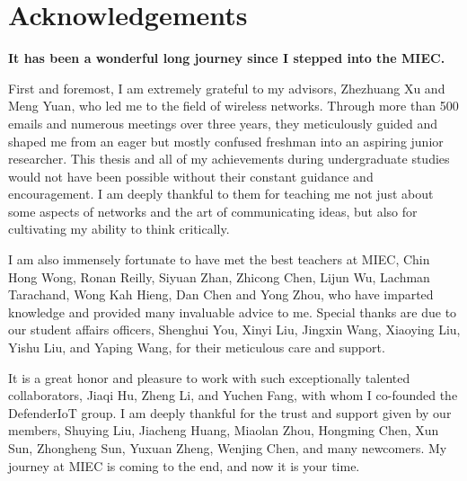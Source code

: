\section*{Acknowledgements}\parskip=-1mm

\vspace{9pt}

\noindent \textbf{It has been a wonderful long journey since I stepped into the MIEC.}

\vspace{9pt}

First and foremost, I am extremely grateful to my advisors, Zhezhuang Xu and Meng Yuan, who led me to the field of wireless networks. Through more than 500 emails and numerous meetings over three years, they meticulously guided and shaped me from an eager but mostly confused freshman into an aspiring junior researcher. This thesis and all of my achievements during undergraduate studies would not have been possible without their constant guidance and encouragement. I am deeply thankful to them for teaching me not just about some aspects of networks and the art of communicating ideas, but also for cultivating my ability to think critically.

\vspace{9pt}

I am also immensely fortunate to have met the best teachers at MIEC, Chin Hong Wong, Ronan Reilly, Siyuan Zhan, Zhicong Chen, Lijun Wu, Lachman Tarachand, Wong Kah Hieng, Dan Chen and Yong Zhou, who have imparted knowledge and provided many invaluable advice to me. Special thanks are due to our student affairs officers, Shenghui You, Xinyi Liu, Jingxin Wang, Xiaoying Liu, Yishu Liu, and Yaping Wang, for their meticulous care and support.

\vspace{9pt}

It is a great honor and pleasure to work with such exceptionally talented collaborators, Jiaqi Hu, Zheng Li, and Yuchen Fang, with whom I co-founded the DefenderIoT group. I am deeply thankful for the trust and support given by our members, Shuying Liu, Jiacheng Huang, Miaolan Zhou, Hongming Chen, Xun Sun, Zhongheng Sun, Yuxuan Zheng, Wenjing Chen, and many newcomers. My journey at MIEC is coming to the end, and now it is your time.



